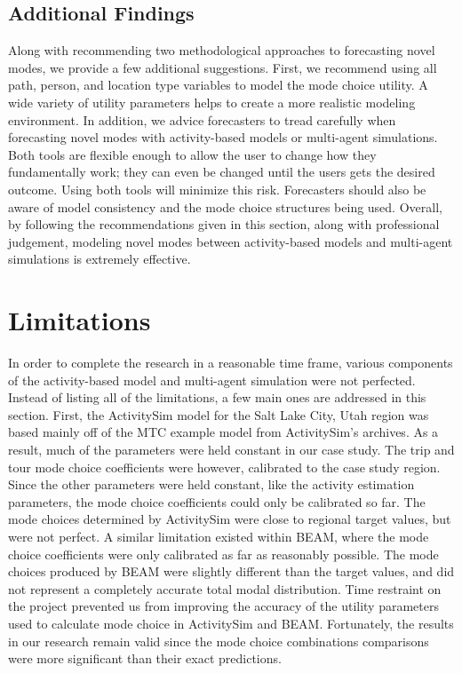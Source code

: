 \documentclass[fancy, masters]{byuthesis}
\begin{document}
\hypertarget{additional-findings}{%
\section{Additional Findings}\label{additional-findings}}

Along with recommending two methodological approaches to forecasting novel modes, we provide a few additional suggestions. First, we recommend using all path, person, and location type variables to model the mode choice utility. A wide variety of utility parameters helps to create a more realistic modeling environment. In addition, we advice forecasters to tread carefully when forecasting novel modes with activity-based models or multi-agent simulations. Both tools are flexible enough to allow the user to change how they fundamentally work; they can even be changed until the users gets the desired outcome. Using both tools will minimize this risk. Forecasters should also be aware of model consistency and the mode choice structures being used. Overall, by following the recommendations given in this section, along with professional judgement, modeling novel modes between activity-based models and multi-agent simulations is extremely effective.

\hypertarget{limitations}{%
\chapter{Limitations}\label{limitations}}

In order to complete the research in a reasonable time frame, various components of the activity-based model and multi-agent simulation were not perfected. Instead of listing all of the limitations, a few main ones are addressed in this section. First, the ActivitySim model for the Salt Lake City, Utah region was based mainly off of the MTC example model from ActivitySim's archives. As a result, much of the parameters were held constant in our case study. The trip and tour mode choice coefficients were however, calibrated to the case study region. Since the other parameters were held constant, like the activity estimation parameters, the mode choice coefficients could only be calibrated so far. The mode choices determined by ActivitySim were close to regional target values, but were not perfect. A similar limitation existed within BEAM, where the mode choice coefficients were only calibrated as far as reasonably possible. The mode choices produced by BEAM were slightly different than the target values, and did not represent a completely accurate total modal distribution. Time restraint on the project prevented us from improving the accuracy of the utility parameters used to calculate mode choice in ActivitySim and BEAM. Fortunately, the results in our research remain valid since the mode choice combinations comparisons were more significant than their exact predictions.
\end{document}
